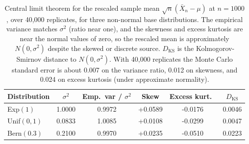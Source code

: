\begin{table}[h]
\centering
\caption{Central limit theorem for the rescaled sample mean $\sqrt{n}(\bar X_n - \mu)$ at $n=1000$, over 40{,}000 replicates, for three non-normal base distributions. The empirical variance matches $\sigma^2$ (ratio near one), and the skewness and excess kurtosis are near the normal values of zero, so the rescaled mean is approximately $N(0,\sigma^2)$ despite the skewed or discrete source. $D_{\mathrm{KS}}$ is the Kolmogorov-Smirnov distance to $N(0,\sigma^2)$. With 40{,}000 replicates the Monte Carlo standard error is about 0.007 on the variance ratio, 0.012 on skewness, and 0.024 on excess kurtosis (under approximate normality).}
\label{tab:prelim_lln_clt}
\begin{tabular}{lccccc}
\hline
Distribution & $\sigma^2$ & Emp.\ var / $\sigma^2$ & Skew & Excess kurt.\ & $D_{\mathrm{KS}}$ \\
\hline
Exp$(1)$ & 1.0000 & 0.9972 & +0.0589 & -0.0176 & 0.0046 \\
Unif$(0,1)$ & 0.0833 & 1.0085 & +0.0108 & -0.0299 & 0.0047 \\
Bern$(0.3)$ & 0.2100 & 0.9970 & +0.0235 & -0.0510 & 0.0223 \\
\hline
\end{tabular}
\end{table}
